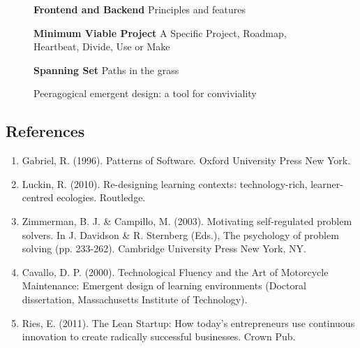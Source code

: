 \begin{figure}
\begin{center}
\textbf{Frontend and Backend} Principles and features

\textbf{Minimum Viable Project} A Specific Project, Roadmap, Heartbeat,
Divide, Use or Make

\textbf{Spanning Set} Paths in the grass
\end{center}
\caption*{Peeragogical emergent design: a tool for conviviality}
\end{figure}



\subsection{References}

\begin{enumerate}
\item
  Gabriel, R. (1996). Patterns of Software. Oxford University Press New
  York.
\item
  Luckin, R. (2010). Re-designing learning contexts: technology-rich,
  learner-centred ecologies. Routledge.
\item
  Zimmerman, B. J. \& Campillo, M. (2003). Motivating self-regulated
  problem solvers. In J. Davidson \& R. Sternberg (Eds.), The psychology
  of problem solving (pp. 233-262). Cambridge University Press New York,
  NY.
\item
  Cavallo, D. P. (2000). Technological Fluency and the Art of Motorcycle
  Maintenance: Emergent design of learning environments (Doctoral
  dissertation, Massachusetts Institute of Technology).
\item
  Ries, E. (2011). The Lean Startup: How today's entrepreneurs use
  continuous innovation to create radically successful businesses. Crown
  Pub.
\end{enumerate}
